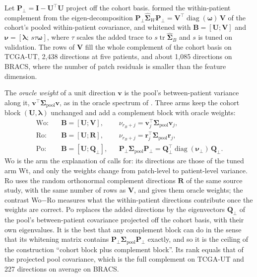 \documentclass[11pt]{article}
\begin{document}
Let $\mathbf P_\perp=\mathbf I-\mathbf U^\top\mathbf U$ project off the cohort basis. \citet{queisler2026withinPatientSpan} formed the within-patient complement from the eigen-decomposition $\mathbf P_\perp\hat{\boldsymbol\Sigma}_W\mathbf P_\perp=\mathbf V^\top\operatorname{diag}(\boldsymbol\omega)\,\mathbf V$ of the cohort's pooled within-patient covariance, and whitened with $\mathbf B=[\mathbf U;\mathbf V]$ and $\boldsymbol\nu=[\boldsymbol\lambda;\,s\tau\boldsymbol\omega]$, where $\tau$ scales the added trace to $s\operatorname{tr}\hat{\boldsymbol\Sigma}_B$ and $s$ is tuned on validation. The rows of $\mathbf V$ fill the whole complement of the cohort basis on TCGA-UT, 2,438 directions at five patients, and about 1,085 directions on BRACS, where the number of patch residuals is smaller than the feature dimension.

The \emph{oracle weight} of a unit direction $\mathbf v$ is the pool's between-patient variance along it, $\mathbf v^\top\boldsymbol\Sigma_{\text{pool}}\mathbf v$, as in the oracle spectrum of \citet{queisler2026spectrumRegularization}. Three arms keep the cohort block $(\mathbf U,\boldsymbol\lambda)$ unchanged and add a complement block with oracle weights:
\begin{align}
  \text{Wo:}\quad & \mathbf B=[\mathbf U;\mathbf V], && \nu_{r_B+j}=\mathbf v_j^\top\boldsymbol\Sigma_{\text{pool}}\mathbf v_j, \label{eq:wo}\\
  \text{Ro:}\quad & \mathbf B=[\mathbf U;\mathbf R], && \nu_{r_B+j}=\mathbf r_j^\top\boldsymbol\Sigma_{\text{pool}}\mathbf r_j, \label{eq:ro}\\
  \text{Po:}\quad & \mathbf B=[\mathbf U;\mathbf Q_\perp], && \mathbf P_\perp\boldsymbol\Sigma_{\text{pool}}\mathbf P_\perp=\mathbf Q_\perp^\top\operatorname{diag}(\boldsymbol\nu_\perp)\,\mathbf Q_\perp . \label{eq:po}
\end{align}
\noindent Wo is the arm the explanation of \citet{queisler2026withinPatientSpan} calls for: its directions are those of the tuned arm Wt, and only the weights change from patch-level to patient-level variance. Ro uses the random orthonormal complement directions $\mathbf R$ of the same source study, with the same number of rows as $\mathbf V$, and gives them oracle weights; the contrast Wo$-$Ro measures what the within-patient directions contribute once the weights are correct. Po replaces the added directions by the eigenvectors $\mathbf Q_\perp$ of the pool's between-patient covariance projected off the cohort basis, with their own eigenvalues. It is the best that any complement block can do in the sense that its whitening matrix contains $\mathbf P_\perp\boldsymbol\Sigma_{\text{pool}}\mathbf P_\perp$ exactly, and so it is the ceiling of the construction ``cohort block plus complement block''. Its rank equals that of the projected pool covariance, which is the full complement on TCGA-UT and 227 directions on average on BRACS.
\end{document}
